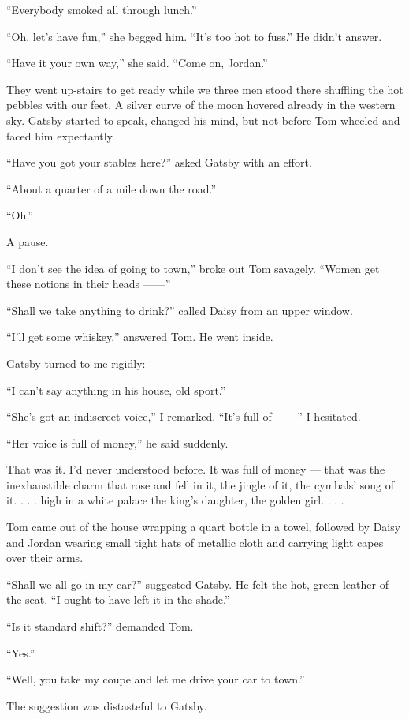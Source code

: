 \documentclass{znotebook}
\begin{document}
``Everybody smoked all through lunch.''

``Oh, let’s have fun,'' she begged him. ``It’s too hot to fuss.'' He didn’t answer.

``Have it your own way,'' she said. ``Come on, Jordan.''

They went up-stairs to get ready while we three men stood there shuffling the hot pebbles with our feet. A silver curve of the moon hovered already in the western sky. Gatsby started to speak, changed his mind, but not before Tom wheeled and faced him expectantly.

``Have you got your stables here?'' asked Gatsby with an effort.

``About a quarter of a mile down the road.''

``Oh.''

A pause.

``I don’t see the idea of going to town,'' broke out Tom savagely. ``Women get these notions in their heads ——''

``Shall we take anything to drink?'' called Daisy from an upper window.

``I’ll get some whiskey,'' answered Tom. He went inside.

Gatsby turned to me rigidly:

``I can’t say anything in his house, old sport.''

``She’s got an indiscreet voice,'' I remarked. ``It’s full of ——'' I hesitated.

``Her voice is full of money,'' he said suddenly.

That was it. I’d never understood before. It was full of money — that was the inexhaustible charm that rose and fell in it, the jingle of it, the cymbals’ song of it. . . . high in a white palace the king’s daughter, the golden girl. . . .

Tom came out of the house wrapping a quart bottle in a towel, followed by Daisy and Jordan wearing small tight hats of metallic cloth and carrying light capes over their arms.

``Shall we all go in my car?'' suggested Gatsby. He felt the hot, green leather of the seat. ``I ought to have left it in the shade.''

``Is it standard shift?'' demanded Tom.

``Yes.''

``Well, you take my coupe and let me drive your car to town.''

The suggestion was distasteful to Gatsby.
\end{document}
